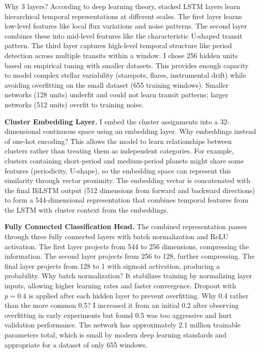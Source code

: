 \documentclass[letterpaper]{article} %
\begin{document}
Why 3 layers? According to deep learning theory, stacked LSTM layers learn hierarchical temporal representations at different scales. The first layer learns low-level features like local flux variations and noise patterns. The second layer combines these into mid-level features like the characteristic U-shaped transit pattern. The third layer captures high-level temporal structure like period detection across multiple transits within a window. I chose 256 hidden units based on empirical tuning with smaller datasets. This provides enough capacity to model complex stellar variability (starspots, flares, instrumental drift) while avoiding overfitting on the small dataset (655 training windows). Smaller networks (128 units) underfit and could not learn transit patterns; larger networks (512 units) overfit to training noise.

\textbf{Cluster Embedding Layer.} I embed the cluster assignments into a 32-dimensional continuous space using an embedding layer. Why embeddings instead of one-hot encoding? This allows the model to learn relationships between clusters rather than treating them as independent categories. For example, clusters containing short-period and medium-period planets might share some features (periodicity, U-shape), so the embedding space can represent this similarity through vector proximity. The embedding vector is concatenated with the final BiLSTM output (512 dimensions from forward and backward directions) to form a 544-dimensional representation that combines temporal features from the LSTM with cluster context from the embeddings.

\textbf{Fully Connected Classification Head.} The combined representation passes through three fully connected layers with batch normalization and ReLU activation. The first layer projects from 544 to 256 dimensions, compressing the information. The second layer projects from 256 to 128, further compressing. The final layer projects from 128 to 1 with sigmoid activation, producing a probability. Why batch normalization? It stabilizes training by normalizing layer inputs, allowing higher learning rates and faster convergence. Dropout with $p=0.4$ is applied after each hidden layer to prevent overfitting. Why 0.4 rather than the more common 0.5? I increased it from an initial 0.2 after observing overfitting in early experiments but found 0.5 was too aggressive and hurt validation performance. The network has approximately 2.1 million trainable parameters total, which is small by modern deep learning standards and appropriate for a dataset of only 655 windows.
\end{document}
